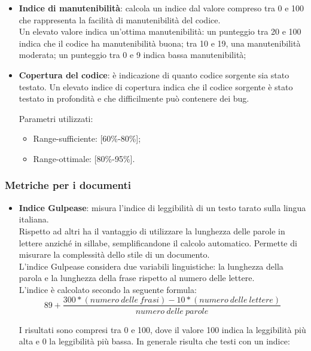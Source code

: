 {{{\begin{itemize}
		\item \textbf{Indice di manutenibilità}: calcola un indice dal valore compreso tra 0 e 100 che rappresenta la facilità di manutenibilità del codice.  \\
		Un elevato valore indica un'ottima manutenibilità: un punteggio tra 20 e 100 indica che il codice ha manutenibilità buona; tra 10 e 19, una manutenibilità moderata; un punteggio tra 0 e 9 indica bassa manutenibilità;
		
		\item \textbf{Copertura del codice}: è indicazione di quanto codice sorgente sia stato testato. Un elevato indice di copertura indica che il codice sorgente è stato testato in profondità e che difficilmente può contenere dei bug.
		
		Parametri utilizzati:
		\begin{itemize}
		\item Range-sufficiente: [60\%-80\%];
		\item Range-ottimale: [80\%-95\%].
		\end{itemize}
	\end{itemize}
	}
\subsubsection{Metriche per i documenti}{
	\label{sec:metricadocumenti}
	\begin{itemize}
		\item \textbf{Indice Gulpease}: misura l'indice di leggibilità di un testo tarato sulla lingua italiana.\\
		Rispetto ad altri ha il vantaggio di utilizzare la lunghezza delle parole in lettere anziché in sillabe, semplificandone il calcolo automatico. Permette di misurare la complessità dello stile di un documento.\\
		L'indice Gulpease considera due variabili linguistiche: la lunghezza della parola e la lunghezza della frase rispetto al numero delle lettere.\\
		L'indice è calcolato secondo la seguente formula:\\
		
		\[89 + \frac{300 *(numero\ delle\ frasi) -10 *(numero\ delle\ lettere)}{numero\ delle\ parole}\]
		
		I risultati sono compresi tra 0 e 100, dove il valore 100 indica la leggibilità più alta e 0 la leggibilità più bassa. In generale risulta che testi con un indice:
		

\end{itemize}}}}
